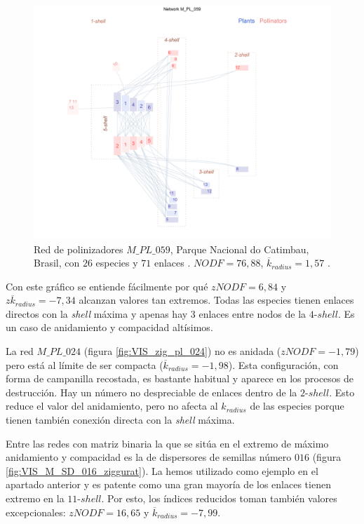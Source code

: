 \begin{figure}[h!]
\centering
\includegraphics[scale=0.42]{Figures/VIS_M_PL_059_ziggurat.png}
\caption {Red de polinizadores $M\_PL\_059$, Parque Nacional do Catimbau, Brasil, con $26$ especies y $71$ enlaces \cite{bezerra2009pollination}. $NODF = 76,88$, $\overline {k}_{radius} = 1,57$ .}
\label{fig:VIS_M_PL_059_ziggurat}
\end{figure}

Con este gráfico se entiende fácilmente por qué $zNODF = 6,84$ y $z \overline {k}_{radius} = -7,34$ alcanzan valores tan extremos. Todas las especies tienen enlaces directos con la \textit{shell} máxima y apenas hay $3$ enlaces entre nodos de la $4$-$shell$. Es un caso de anidamiento y compacidad altísimos.

La red $M\_PL\_024$ (figura \ref{fig:VIS_zig_pl_024}) no es anidada ($zNODF = -1,79$) pero está al límite de ser compacta ($\overline {k}_{radius} = -1,98$). Esta configuración, con forma de campanilla recostada, es bastante habitual y aparece en los procesos de destrucción. Hay un número no despreciable de enlaces dentro de la $2$-$shell$. Esto reduce el valor del anidamiento, pero no afecta al ${k}_{radius}$ de las especies porque tienen también conexión directa con la \textit{shell} máxima.

Entre las redes con matriz binaria la que se sitúa en el extremo de máximo anidamiento y compacidad es la de dispersores de semillas número $016$ (figura \ref{fig:VIS_M_SD_016_ziggurat}). La hemos utilizado como ejemplo en el apartado anterior y es patente como una gran mayoría de los enlaces tienen extremo en la $11$-$shell$. Por esto, los índices reducidos toman también
valores excepcionales: $zNODF = 16,65$ y $\overline {k}_{radius} = -7,99$.

